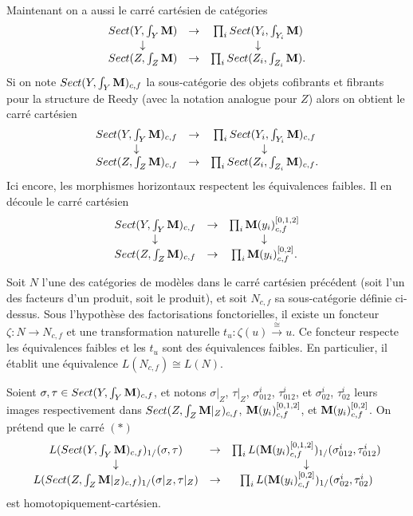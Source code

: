 \documentclass[12pt]{article}
\newcommand{\mm}{{\bf M}}
\begin{document}
Maintenant on a aussi le carr\'e cart\'esien de cat\'egories
$$
\begin{array}{ccc}
Sect (Y,\int _{Y}\mm )& \rightarrow & \prod _iSect (Y_i,\int _{Y_i}\mm )
\\ \downarrow && \downarrow \\
Sect (Z,\int _{Z}\mm ) & \rightarrow &
\prod _i Sect (Z_i,\int _{Z_i}\mm ).
\end{array}
$$
Si on note $Sect (Y,\int _{Y}\mm )_{c,f}$ la sous-cat\'egorie des objets
cofibrants et fibrants pour la structure de Reedy
(avec la notation analogue pour
$Z$) alors on obtient le carr\'e cart\'esien
$$
\begin{array}{ccc}
Sect (Y,\int _{Y}\mm ) _{c,f}& \rightarrow & \prod _iSect (Y_i,\int _{Y_i}\mm )
_{c,f}
\\ \downarrow && \downarrow \\
Sect (Z,\int _{Z}\mm )  _{c,f}& \rightarrow &
\prod _i Sect (Z_i,\int _{Z_i}\mm )  _{c,f}.
\end{array}
$$
Ici encore, les morphismes horizontaux respectent les \'equivalences faibles.
Il en d\'ecoule le carr\'e cart\'esien
$$
\begin{array}{ccc}
Sect (Y,\int _{Y}\mm ) _{c,f}& \rightarrow & \prod _i \mm (y_i) ^{[0,1,2]}
_{c,f}\\ \downarrow && \downarrow \\
Sect (Z,\int _{Z}\mm )  _{c,f}& \rightarrow & \prod _i\mm (y_i) ^{[0,2]} _{c,f}.
\end{array}
$$

Soit $N$ l'une des cat\'egories de mod\`eles dans le carr\'e cart\'esien
pr\'ec\'edent (soit l'un des facteurs d'un produit, soit le produit), et soit
$N_{c,f}$ sa sous-cat\'egorie d\'efinie ci-dessus. Sous l'hypoth\`ese des
factorisations fonctorielles, il existe un foncteur $\zeta : N\rightarrow
N_{c,f}$ et une transformation naturelle $t_u: \zeta
(u)\stackrel{\cong}{\rightarrow} u$. Ce foncteur respecte les \'equivalences
faibles et les $t_u$ sont des \'equivalences faibles. En particulier, il
\'etablit une \'equivalence $L(N_{c,f})\cong L(N)$.



Soient $\sigma , \tau \in Sect (Y, \int _Y\mm )_{c,f}$, et notons
$\sigma |_Z$, $\tau |_Z$, $\sigma ^i_{012}$, $\tau ^i_{012}$, et $\sigma
^i_{02}$, $\tau ^i_{02}$ leurs images respectivement dans $Sect (Z,\int _Z\mm
|_Z)_{c,f}$, $\mm (y_i)^{[0,1,2]}_{c,f}$, et $\mm (y_i)^{[0,2]}_{c,f}$. On
pr\'etend que le carr\'e  $(\ast )$
$$
\begin{array}{ccc}
L(Sect (Y, \int _Y\mm )_{c,f})_{1/}(\sigma , \tau )
&\rightarrow & \prod _i L(\mm (y_i)^{[0,1,2]}_{c,f})_{1/}(\sigma
^i_{012},\tau ^i
_{012})\\ \downarrow && \downarrow \\
L(Sect (Z, \int _Z\mm |_Z)_{c,f})_{1/}(\sigma |_Z, \tau |_Z)
& \rightarrow & \prod _i L(\mm (y_i)^{[0,2]}_{c,f})_{1/}(\sigma ^i_{02},\tau
^i_{02}) \end{array}
$$
est homotopiquement-cart\'esien.
\end{document}
